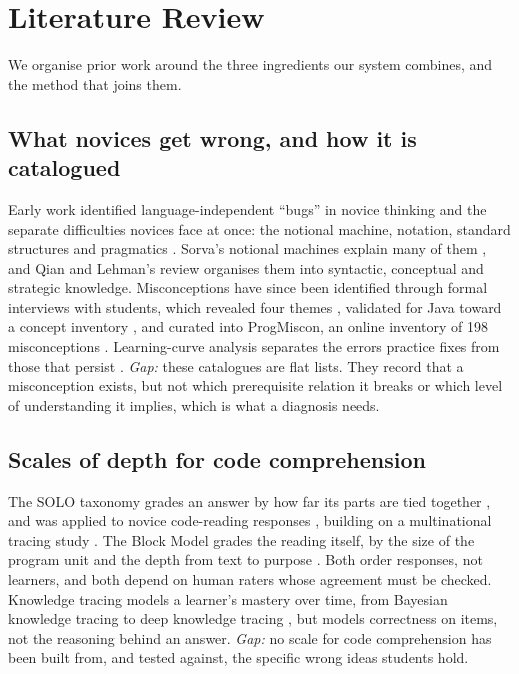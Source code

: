 \documentclass[sigconf,nonacm]{acmart}
\begin{document}
\section{Literature Review}
\label{sec:lit}
We organise prior work around the three ingredients our system combines, and the method that joins them.

\subsection{What novices get wrong, and how it is catalogued}
Early work identified language-independent ``bugs'' in novice thinking \cite{pea1986bugs} and the separate
difficulties novices face at once: the notional machine, notation, standard structures and pragmatics
\cite{duboulay1986difficulties}. Sorva's notional machines explain many of them \cite{sorva2013notional}, and Qian and
Lehman's review \cite{qian2017misconceptions} organises them into syntactic, conceptual and strategic
knowledge. Misconceptions have since been identified through formal interviews with students, which revealed four themes
\cite{kaczmarczyk2010identifying},
validated for Java toward a concept inventory \cite{caceffo2019java}, and curated into ProgMiscon, an online
inventory of 198 misconceptions \cite{chiodini2021progmiscon}. Learning-curve analysis separates the errors
practice fixes from those that persist \cite{rivers2016learning}. \emph{Gap:} these catalogues are flat lists.
They record that a misconception exists, but not which prerequisite relation it breaks or which level of
understanding it implies, which is what a diagnosis needs.

\subsection{Scales of depth for code comprehension}
The SOLO taxonomy grades an answer by how far its parts are tied together \cite{biggs1982solo}, and was
applied to novice code-reading responses \cite{lister2006forest}, building on a multinational tracing study \cite{lister2004multinational}.
The Block Model grades the reading itself, by the size of the program unit and the depth from text to purpose
\cite{schulte2008block}. Both order responses, not learners, and both depend on human raters whose agreement
must be checked. Knowledge tracing models a learner's mastery over time, from Bayesian knowledge tracing
\cite{corbett1994knowledge} to deep knowledge tracing \cite{piech2015deep}, but models correctness on items,
not the reasoning behind an answer. \emph{Gap:} no scale for code comprehension has been built from, and tested
against, the specific wrong ideas students hold.
\end{document}
